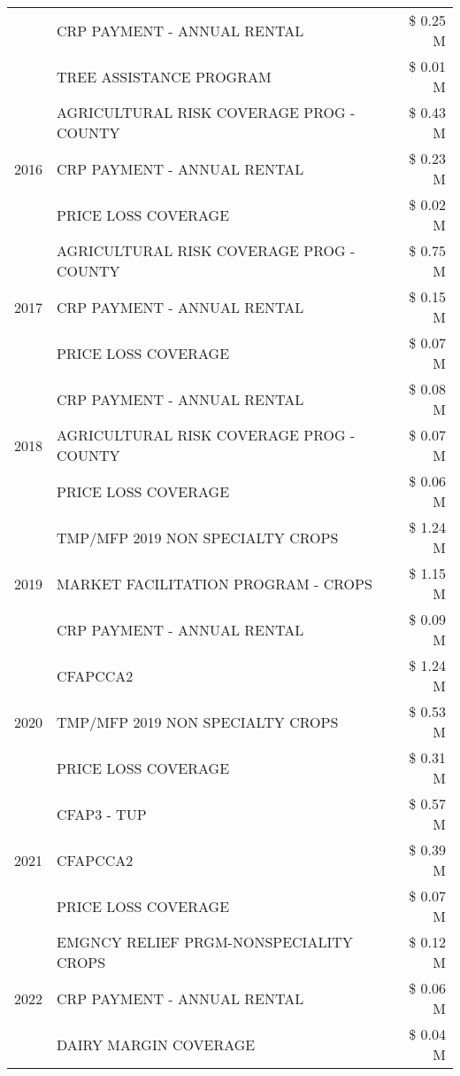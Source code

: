 \begin{tabular}{llr}
 & CRP PAYMENT - ANNUAL RENTAL & \$ 0.25 M \\
 & TREE ASSISTANCE PROGRAM & \$ 0.01 M \\
\cline{1-3}
\multirow[t]{3}{*}{2016} & AGRICULTURAL RISK COVERAGE PROG - COUNTY & \$ 0.43 M \\
 & CRP PAYMENT - ANNUAL RENTAL & \$ 0.23 M \\
 & PRICE LOSS COVERAGE & \$ 0.02 M \\
\cline{1-3}
\multirow[t]{3}{*}{2017} & AGRICULTURAL RISK COVERAGE PROG - COUNTY & \$ 0.75 M \\
 & CRP PAYMENT - ANNUAL RENTAL & \$ 0.15 M \\
 & PRICE LOSS COVERAGE & \$ 0.07 M \\
\cline{1-3}
\multirow[t]{3}{*}{2018} & CRP PAYMENT - ANNUAL RENTAL & \$ 0.08 M \\
 & AGRICULTURAL RISK COVERAGE PROG - COUNTY & \$ 0.07 M \\
 & PRICE LOSS COVERAGE & \$ 0.06 M \\
\cline{1-3}
\multirow[t]{3}{*}{2019} & TMP/MFP 2019 NON SPECIALTY CROPS & \$ 1.24 M \\
 & MARKET FACILITATION PROGRAM - CROPS & \$ 1.15 M \\
 & CRP PAYMENT - ANNUAL RENTAL & \$ 0.09 M \\
\cline{1-3}
\multirow[t]{3}{*}{2020} & CFAPCCA2 & \$ 1.24 M \\
 & TMP/MFP 2019 NON SPECIALTY CROPS & \$ 0.53 M \\
 & PRICE LOSS COVERAGE & \$ 0.31 M \\
\cline{1-3}
\multirow[t]{3}{*}{2021} & CFAP3 - TUP & \$ 0.57 M \\
 & CFAPCCA2 & \$ 0.39 M \\
 & PRICE LOSS COVERAGE & \$ 0.07 M \\
\cline{1-3}
\multirow[t]{3}{*}{2022} & EMGNCY RELIEF PRGM-NONSPECIALITY CROPS & \$ 0.12 M \\
 & CRP PAYMENT - ANNUAL RENTAL & \$ 0.06 M \\
 & DAIRY MARGIN COVERAGE & \$ 0.04 M \\
\cline{1-3}
\bottomrule
\end{tabular}
